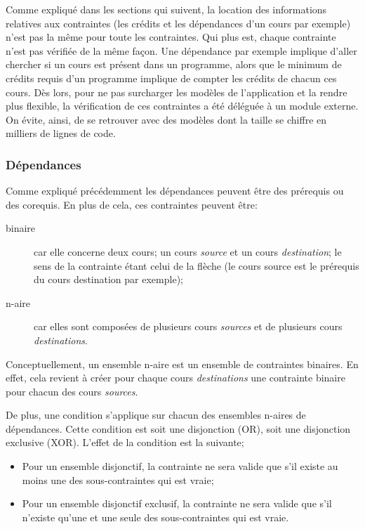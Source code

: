 Comme expliqué dans les sections qui suivent, la location des informations relatives aux contraintes (les crédits et les dépendances d'un cours par exemple) n'est pas la même pour toute les contraintes. Qui plus est, chaque contrainte n'est pas vérifiée de la même façon. Une dépendance par exemple implique d'aller chercher si un cours est présent dans un programme, alors que le minimum de crédits requis d'un programme implique de compter les crédits de chacun ces cours. Dès lors, pour ne pas surcharger les modèles de l'application et la rendre plus flexible, la vérification de ces contraintes a été déléguée à un module externe. On évite, ainsi, de se retrouver avec des modèles dont la taille se chiffre en milliers de lignes de code. 
\subsubsection{Dépendances}
\label{dependances}
Comme expliqué précédemment les dépendances peuvent être des prérequis ou des corequis. En plus de cela, ces contraintes peuvent être:
\begin{description}
\item[binaire] car elle concerne deux cours; un cours \textit{source} et un cours \textit{destination}; le sens de la contrainte étant celui de la flèche (le cours source est le prérequis du cours destination par exemple);
\item[n-aire] car elles sont composées de plusieurs cours \textit{sources} et de plusieurs cours \textit{destinations}.
\end{description}

Conceptuellement, un ensemble n-aire est un ensemble de contraintes binaires. En effet, cela revient à créer pour chaque cours \textit{destinations} une contrainte binaire pour chacun des cours \textit{sources}. 

De plus, une condition s'applique sur chacun des ensembles n-aires de dépendances. Cette condition est soit une disjonction (OR), soit une disjonction exclusive (XOR). L'effet de la condition est la suivante;

\begin{itemize}
\item Pour un ensemble disjonctif, la contrainte ne sera valide que s'il existe au moins une des sous-contraintes qui est vraie;
\item Pour un ensemble disjonctif exclusif, la contrainte ne sera valide que s'il n'existe qu'une et une seule des sous-contraintes qui est vraie.
\end{itemize}


